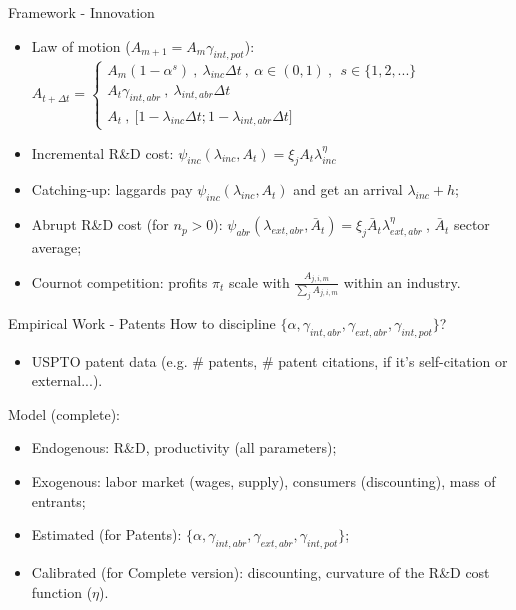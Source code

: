\documentclass[11pt]{beamer}
\begin{document}
\begin{frame}{Framework - Innovation}
	\begin{itemize}\itemsep10pt	
	\item Law of motion ($A_{m+1} = A_m\gamma_{int, pot}$): $A_{t+\Delta t} =\begin{cases}
               A_m(1-\alpha^{s})\:,\: \lambda_{inc}\Delta t \:,\: \alpha \in (0,1)\:,\:\ s \in \{1, 2, ...\}\\
               A_t\gamma_{int,abr}\:,\: \lambda_{int,abr}\Delta t\\
               A_t \:, \: \big[1 - \lambda_{inc}\Delta t; 1 - \lambda_{int,abr}\Delta t\big] 
    \end{cases}$
	\item Incremental R\&D cost: $\psi_{inc}(\lambda_{inc}, A_{t}) = \xi_j A_t \lambda_{inc}^{\eta}$
	\item Catching-up: laggards pay $\psi_{inc}(\lambda_{inc}, A_{t})$ and get an arrival $\lambda_{inc} + h$;
	\item Abrupt R\&D cost (for $n_p > 0$): $\psi_{abr}(\lambda_{ext,abr}, \bar{A}_{t}) = \xi_j \bar{A}_t \lambda_{ext,abr}^{\eta}\:$, $\bar{A}_{t}$ sector average;
	\item Cournot competition: profits $\pi_t$ scale with $\frac{A_{j,i,m}}{\sum_{j}A_{j,i,m}}$ within an industry.
	\end{itemize}
\end{frame}

\begin{frame}{Empirical Work - Patents}
How to discipline $\{\alpha, \gamma_{int, abr}, \gamma_{ext,abr},\gamma_{int, pot}\}$?
	\begin{itemize}\itemsep12pt	
		\item USPTO patent data (e.g. \# patents, \# patent citations, if it's self-citation or external...).
	\end{itemize}
Model (complete):
	\begin{itemize}
		\item Endogenous: R\&D, productivity (all parameters);
		\item Exogenous: labor market (wages, supply), consumers (discounting), mass of entrants;
		\item Estimated (for Patents): $\{\alpha, \gamma_{int, abr}, \gamma_{ext,abr},\gamma_{int, pot}\}$;
		\item Calibrated (for Complete version): discounting, curvature of the R\&D cost function ($\eta$).
	\end{itemize}
\end{frame}
\end{document}
